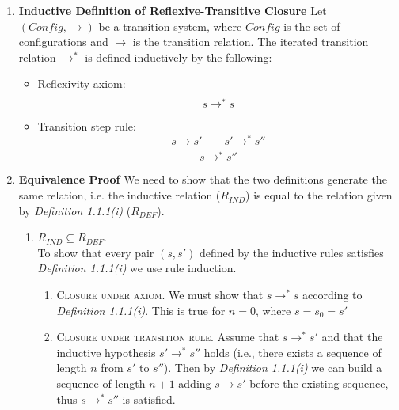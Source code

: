 \begin{solution}
\begin{enumerate}
    \item \textbf{Inductive Definition of Reflexive-Transitive Closure}
Let $(Config, \rightarrow) $ be a transition system, where $Config$ is the set of configurations and $\rightarrow$ is the transition relation. The iterated transition relation $\rightarrow^*$ is defined inductively by the following: 
\begin{itemize}
    \item Reflexivity axiom: \[\frac{}{s \to^* s}\]
    \item Transition step rule:
    \[ \frac{s \to s' \qquad  s' \to^* s''}{s \to^* s''}\]
\end{itemize}
\item \textbf{Equivalence Proof}  We need to show that the two definitions generate the same relation, i.e. the inductive relation ($R_{IND}$) is equal to the relation given by \textit{Definition 1.1.1(i)} ($R_{DEF}$).
\begin{enumerate}
    \item \textbf{$R_{IND} \subseteq R_{DEF}$}. \\ To show that every pair $(s,s')$ defined by the inductive rules satisfies \textit{Definition 1.1.1(i)} we use rule induction.
    \begin{enumerate}
        \item \textsc{Closure under axiom}. We must show that $s\to^*s$ according to \textit{Definition 1.1.1(i)}. This is true for $n=0$, where $s=s_0=s'$
        \item \textsc{Closure under transition rule}. Assume that $s\to^*s'$ and that the inductive hypothesis $s'\to^* s''$ holds (i.e., there exists a sequence of length $n$ from $s'$ to $s''$). Then by  \textit{Definition 1.1.1(i)}  we can build a sequence of length $n+1$ adding $s \to s'$ before the existing sequence, thus $s \to^* s''$ is satisfied.
    

\end{enumerate}
\end{enumerate}
\end{enumerate}
\end{solution}
